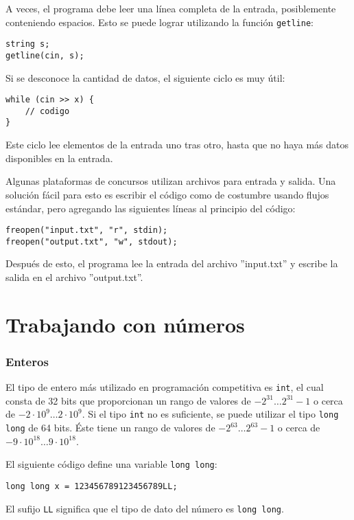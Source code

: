 A veces, el programa debe leer una línea completa
de la entrada, posiblemente conteniendo espacios.
Esto se puede lograr utilizando
la función \texttt{getline}:

\begin{lstlisting}
string s;
getline(cin, s);
\end{lstlisting}

Si se desconoce la cantidad de datos, el siguiente
ciclo es muy útil:
\begin{lstlisting}
while (cin >> x) {
    // codigo
}
\end{lstlisting}
Este ciclo lee elementos de la entrada
uno tras otro, hasta que no haya
más datos disponibles en la entrada.

Algunas plataformas de concursos utilizan archivos para
entrada y salida.
Una solución fácil para esto es escribir
el código como de costumbre usando flujos estándar,
pero agregando las siguientes líneas al principio del código:
\begin{lstlisting}
freopen("input.txt", "r", stdin);
freopen("output.txt", "w", stdout);
\end{lstlisting}
Después de esto, el programa lee la entrada del archivo
''input.txt'' y escribe la salida en el archivo
''output.txt''.

\section{Trabajando con números}


\subsubsection{Enteros}

El tipo de entero más utilizado en programación competitiva
es \texttt{int}, el cual consta de 32 bits que proporcionan
un rango de valores de $-2^{31} \ldots 2^{31}-1$
o cerca de $-2 \cdot 10^9 \ldots 2 \cdot 10^9$.
Si el tipo \texttt{int} no es suficiente,
se puede utilizar el tipo \texttt{long long} de 64 bits.
Éste tiene un rango de valores de $-2^{63} \ldots 2^{63}-1$
o cerca de $-9 \cdot 10^{18} \ldots 9 \cdot 10^{18}$.

El siguiente código define una variable
\texttt{long long}:
\begin{lstlisting}
long long x = 123456789123456789LL;
\end{lstlisting}
El sufijo \texttt{LL} significa que el
tipo de dato del número es \texttt{long long}.

